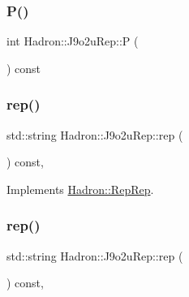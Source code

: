 \mbox{\label{structHadron_1_1J9o2uRep_a3aebae1f874d8463e884f81517de21a8}} 
\subsubsection{\texorpdfstring{P()}{P()}\hspace{0.1cm}{\footnotesize\ttfamily [2/2]}}
{\footnotesize\ttfamily int Hadron\+::\+J9o2u\+Rep\+::P (\begin{DoxyParamCaption}{ }\end{DoxyParamCaption}) const\hspace{0.3cm}{\ttfamily [inline]}}

\mbox{\label{structHadron_1_1J9o2uRep_ac55275a024a1bfeefef8a2916dcf8a3c}} 
\subsubsection{\texorpdfstring{rep()}{rep()}\hspace{0.1cm}{\footnotesize\ttfamily [1/2]}}
{\footnotesize\ttfamily std\+::string Hadron\+::\+J9o2u\+Rep\+::rep (\begin{DoxyParamCaption}{ }\end{DoxyParamCaption}) const\hspace{0.3cm}{\ttfamily [inline]}, {\ttfamily [virtual]}}



Implements \mbox{\hyperlink{structHadron_1_1RepRep_ab3213025f6de249f7095892109575fde}{Hadron\+::\+Rep\+Rep}}.

\mbox{\label{structHadron_1_1J9o2uRep_ac55275a024a1bfeefef8a2916dcf8a3c}} 
\subsubsection{\texorpdfstring{rep()}{rep()}\hspace{0.1cm}{\footnotesize\ttfamily [2/2]}}
{\footnotesize\ttfamily std\+::string Hadron\+::\+J9o2u\+Rep\+::rep (\begin{DoxyParamCaption}{ }\end{DoxyParamCaption}) const\hspace{0.3cm}{\ttfamily [inline]}, {\ttfamily [virtual]}}



